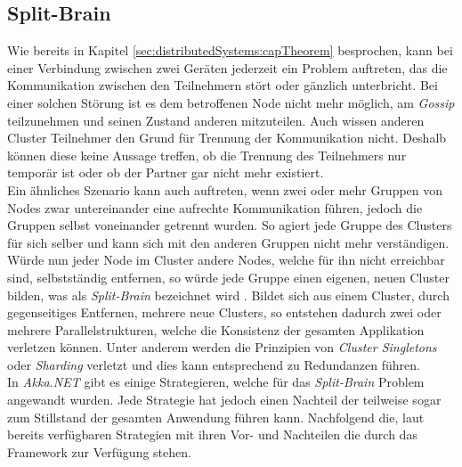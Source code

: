 \subsection{Split-Brain} 
\label{subsec:implementation:splitBrain}
Wie bereits in Kapitel \ref{sec:distributedSystems:capTheorem} besprochen, kann bei einer Verbindung zwischen zwei Geräten jederzeit ein Problem auftreten, das die Kommunikation zwischen den Teilnehmern stört oder gänzlich unterbricht. Bei einer solchen Störung ist es dem betroffenen Node nicht mehr möglich, am \textit{Gossip} teilzunehmen und seinen Zustand anderen mitzuteilen. Auch wissen anderen Cluster Teilnehmer den Grund für Trennung der Kommunikation nicht. Deshalb können diese keine Aussage treffen, ob die Trennung des Teilnehmers nur temporär ist oder ob der Partner gar nicht mehr existiert. \\
Ein ähnliches Szenario kann auch auftreten, wenn zwei oder mehr Gruppen von Nodes zwar untereinander eine aufrechte Kommunikation führen, jedoch die Gruppen selbst voneinander getrennt wurden. So agiert jede Gruppe des Clusters für sich selber und kann sich mit den anderen Gruppen nicht mehr verständigen. Würde nun jeder Node im Cluster andere Nodes, welche für ihn nicht erreichbar sind, selbstständig entfernen, so würde jede Gruppe einen eigenen, neuen Cluster bilden, was als \textit{Split-Brain} bezeichnet wird \citep{networkIsReliable}. Bildet sich aus einem Cluster, durch gegenseitiges Entfernen, mehrere neue Clusters, so entstehen dadurch zwei oder mehrere Parallelstrukturen, welche die Konsistenz der gesamten Applikation verletzen können. Unter anderem werden die Prinzipien von \textit{Cluster Singletons} oder \textit{Sharding} verletzt und dies kann entsprechend zu Redundanzen führen. \\
In \textit{Akka.NET} gibt es einige Strategieren, welche für das \textit{Split-Brain} Problem angewandt wurden. Jede Strategie hat jedoch einen Nachteil der teilweise sogar zum Stillstand der gesamten Anwendung führen kann. Nachfolgend die, laut \cite{Akka.NETCommunityAkka.NETDocumentation} bereits verfügbaren Strategien mit ihren Vor- und Nachteilen die durch das Framework zur Verfügung stehen.
